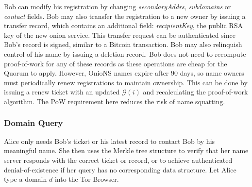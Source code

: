 \documentclass[USenglish,oneside,twocolumn]{article}
\begin{document}
Bob can modify his registration by changing \emph{secondaryAddrs}, \emph{subdomains} or \emph{contact} fields. Bob may also transfer the registration to a new owner by issuing a transfer record, which contains an additional field: \emph{recipientKey}, the public RSA key of the new onion service. This transfer request can be authenticated since Bob's record is signed, similar to a Bitcoin transaction. Bob may also relinquish control of his name by issuing a deletion record. Bob does not need to recompute proof-of-work for any of these records as these operations are cheap for the Quorum to apply. However, OnioNS names expire after 90 days, so name owners must periodically renew registrations to maintain ownership. This can be done by issuing a renew ticket with an updated $ \mathcal{G}(i) $ and recalculating the proof-of-work algorithm. The PoW requirement here reduces the risk of name squatting.


\subsubsection{Domain Query}

Alice only needs Bob's ticket or his latest record to contact Bob by his meaningful name. She then uses the Merkle tree structure to verify that her name server responds with the correct ticket or record, or to achieve authenticated denial-of-existence if her query has no corresponding data structure. Let Alice type a domain $ d $ into the Tor Browser.
\end{document}
